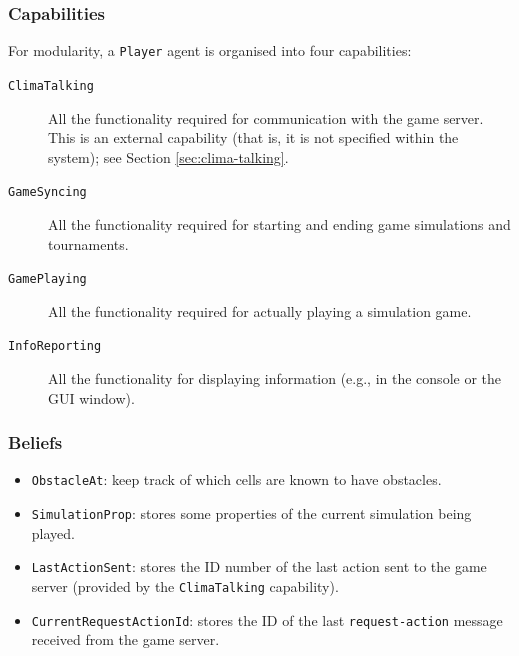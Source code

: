 \documentclass[10pt]{article}
\begin{document}
\subsubsection*{Capabilities}

For modularity, a \texttt{Player} agent is organised into four capabilities:
\begin{description}
 \item[\rm \texttt{ClimaTalking}] All the functionality required for
communication with the game server. This is an external capability (that is,
it is not specified within the system); see Section \ref{sec:clima-talking}.

 \item[\rm \texttt{GameSyncing}] All the functionality required for starting
and ending game simulations and tournaments.

 \item[\rm \texttt{GamePlaying}] All the functionality required for
actually playing a simulation game.

 \item[\rm \texttt{InfoReporting}] All the functionality for displaying
information (e.g., in the console or the GUI window).

\end{description}



%
\subsubsection*{Beliefs}
\begin{itemize}
\item \texttt{ObstacleAt}: keep track of which cells are known to have obstacles.

\item \texttt{SimulationProp}: stores some properties of the current simulation
being played.

\item \texttt{LastActionSent}: stores the ID number of the last action sent to
the game server (provided by the \texttt{ClimaTalking} capability).

\item \texttt{CurrentRequestActionId}: stores the ID of the last
\texttt{request-action} message received from the game server.
\end{itemize}


\end{document}
